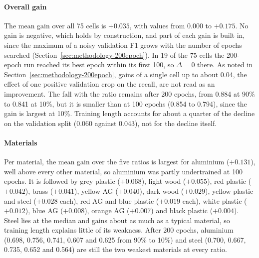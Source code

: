 \paragraph{Overall gain}
The mean gain over all 75 cells is $+0.035$, with values from 0.000 to $+0.175$. No
gain is negative, which holds by construction, and part of each gain is built in,
since the maximum of a noisy validation F1 grows with the number of epochs searched
(Section~\ref{sec:methodology-200epoch}). In 19 of the 75 cells the 200-epoch run
reached its best epoch within its first 100, so $\Delta = 0$ there. As noted in
Section~\ref{sec:methodology-200epoch}, gains of a single cell up to about 0.04, the
effect of one positive validation crop on the recall, are not read as an improvement. The fall
with the ratio remains after 200 epochs, from 0.884 at 90\% to 0.841 at 10\%, but it is
smaller than at 100 epochs (0.854 to 0.794), since the gain is largest at 10\%.
Training length accounts for about a quarter of the decline on the validation
split (0.060 against 0.043), not for the decline itself.

\paragraph{Materials}
Per material, the mean gain over the five ratios is largest for aluminium ($+0.131$),
well above every other material, so aluminium was partly undertrained at 100 epochs. It is
followed by grey plastic ($+0.068$), light wood ($+0.055$), red plastic ($+0.042$),
brass ($+0.041$), yellow AG ($+0.040$), dark wood ($+0.029$), yellow plastic and steel
($+0.028$ each), red AG and blue plastic ($+0.019$ each), white plastic ($+0.012$),
blue AG ($+0.008$), orange AG ($+0.007$) and black plastic ($+0.004$). Steel lies at
the median and gains about as much as a typical material, so training length
explains little of its weakness. After 200 epochs, aluminium (0.698, 0.756, 0.741, 0.607 and
0.625 from 90\% to 10\%) and steel (0.700, 0.667, 0.735, 0.652 and 0.564) are still the
two weakest materials at every ratio.

